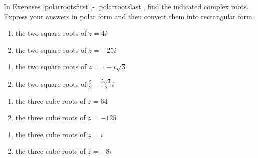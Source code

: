 In Exercises \ref{polarrootsfirst} - \ref{polarrootslast}, find the indicated complex roots.  Express your answers in polar form and then convert them into rectangular form.

\begin{multicols}{2}

\begin{enumerate}

\setcounter{enumi}{\value{HW}}

\item the two square roots of $z = 4i$ \label{polarrootsfirst}
\item the two square roots of $z = -25i$

\setcounter{HW}{\value{enumi}}

\end{enumerate}

\end{multicols}

\begin{multicols}{2} 

\begin{enumerate}

\setcounter{enumi}{\value{HW}}

\item the two square roots of $z = 1 + i\sqrt{3}$
\item the two square roots of $\frac{5}{2} - \frac{5\sqrt{3}}{2}i$

\setcounter{HW}{\value{enumi}}

\end{enumerate}

\end{multicols}

\begin{multicols}{2} 

\begin{enumerate}

\setcounter{enumi}{\value{HW}}

\item  the three cube roots of $z=64$
\item  the three cube roots of $z = -125$

\setcounter{HW}{\value{enumi}}

\end{enumerate}

\end{multicols}

\begin{multicols}{2} 

\begin{enumerate}

\setcounter{enumi}{\value{HW}}

\item  the three cube roots of $z = i$
\item  the three cube roots of $z = -8i$

\setcounter{HW}{\value{enumi}}

\end{enumerate}

\end{multicols}

